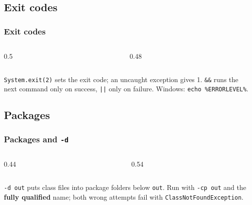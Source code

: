 \documentclass[aspectratio=169,10pt,compress]{beamer}
\begin{document}
\subsection[Exit]{Exit codes}




\begin{frame}[t,fragile] \frametitle{Exit codes}
  \begin{columns}[T]
    \begin{column}{0.5\textwidth}
    \end{column}
    \begin{column}{0.48\textwidth}
    \end{column}
  \end{columns}

  \vspace{0.2em}
  \small \texttt{System.exit(2)} sets the exit code; an uncaught exception gives 1. \texttt{\&\&} runs the next command only on success,
  \texttt{||} only on failure. Windows: \texttt{echo \%ERRORLEVEL\%}.
\end{frame}


\subsection[Packages]{Packages}




\begin{frame}[t,fragile] \frametitle{Packages and \texttt{-d}}
  \begin{columns}[T]
    \begin{column}{0.44\textwidth}
    \end{column}
    \begin{column}{0.54\textwidth}
    \end{column}
  \end{columns}

  \vspace{0.2em}
  \small \texttt{-d out} puts class files into package folders below \texttt{out}. Run with \texttt{-cp out} and the
  \textbf{fully qualified} name; both wrong attempts fail with \texttt{ClassNotFoundException}.
\end{frame}
\end{document}
